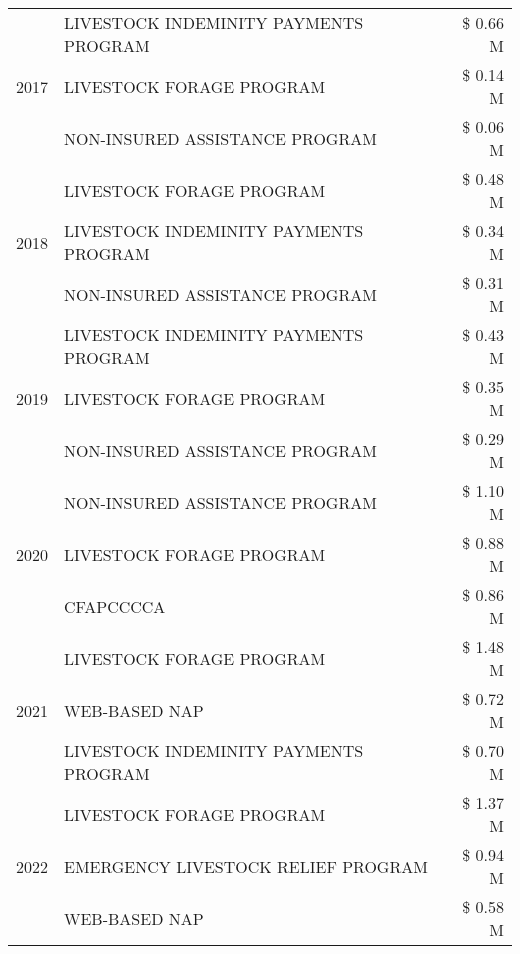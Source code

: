 \begin{tabular}{llr}
\cline{1-3}
\multirow[t]{3}{*}{2017} & LIVESTOCK INDEMINITY PAYMENTS PROGRAM & \$ 0.66 M \\
 & LIVESTOCK FORAGE PROGRAM & \$ 0.14 M \\
 & NON-INSURED ASSISTANCE PROGRAM & \$ 0.06 M \\
\cline{1-3}
\multirow[t]{3}{*}{2018} & LIVESTOCK FORAGE PROGRAM & \$ 0.48 M \\
 & LIVESTOCK INDEMINITY PAYMENTS PROGRAM & \$ 0.34 M \\
 & NON-INSURED ASSISTANCE PROGRAM & \$ 0.31 M \\
\cline{1-3}
\multirow[t]{3}{*}{2019} & LIVESTOCK INDEMINITY PAYMENTS PROGRAM & \$ 0.43 M \\
 & LIVESTOCK FORAGE PROGRAM & \$ 0.35 M \\
 & NON-INSURED ASSISTANCE PROGRAM & \$ 0.29 M \\
\cline{1-3}
\multirow[t]{3}{*}{2020} & NON-INSURED ASSISTANCE PROGRAM & \$ 1.10 M \\
 & LIVESTOCK FORAGE PROGRAM & \$ 0.88 M \\
 & CFAPCCCCA & \$ 0.86 M \\
\cline{1-3}
\multirow[t]{3}{*}{2021} & LIVESTOCK FORAGE PROGRAM & \$ 1.48 M \\
 & WEB-BASED NAP & \$ 0.72 M \\
 & LIVESTOCK INDEMINITY PAYMENTS PROGRAM & \$ 0.70 M \\
\cline{1-3}
\multirow[t]{3}{*}{2022} & LIVESTOCK FORAGE PROGRAM & \$ 1.37 M \\
 & EMERGENCY LIVESTOCK RELIEF PROGRAM & \$ 0.94 M \\
 & WEB-BASED NAP & \$ 0.58 M \\
\cline{1-3}
\bottomrule
\end{tabular}

